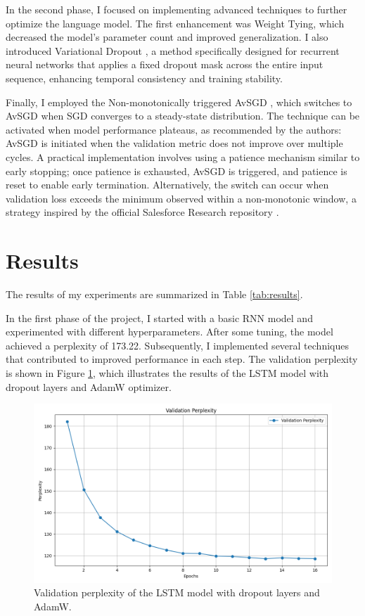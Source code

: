 \documentclass[a4paper]{article}
\begin{document}
In the second phase, I focused on implementing advanced techniques
 to further optimize the language model. The first enhancement was Weight Tying,
  which decreased the model’s parameter count and improved generalization. I also 
  introduced Variational Dropout \cite{gal2016theoreticallygroundedapplicationdropout}, 
  a method specifically designed for recurrent neural networks that applies a fixed dropout 
  mask across the entire input sequence, enhancing temporal consistency and training stability.

Finally, I employed the Non-monotonically triggered AvSGD \cite{merityRegOpt}, which 
switches to AvSGD when SGD converges to a steady-state distribution. The technique can be
 activated when model performance plateaus, as recommended by the authors: AvSGD is initiated 
 when the validation metric does not improve over multiple cycles. A practical implementation 
 involves using a patience mechanism similar to early stopping; once patience is exhausted, AvSGD
  is triggered, and patience is reset to enable early termination. Alternatively, the switch 
  can occur when validation loss exceeds the minimum observed within a non-monotonic window, a 
  strategy inspired by the official Salesforce Research repository \cite{salesforce-repo}.

\section{Results}
The results of my experiments are summarized in Table \ref{tab:results}.

In the first phase of the project, I started with a basic RNN model and experimented with different hyperparameters. After some tuning, the model achieved a perplexity of 173.22. Subsequently, I implemented several techniques that contributed to improved performance in each step. The validation perplexity is shown in Figure \ref{fig:plot}, which illustrates the results of the LSTM model with dropout layers and AdamW optimizer.

\begin{figure}[h!]
\centering
\includegraphics[width=0.8\linewidth]{images/part_A.png}
\caption{Validation perplexity of the LSTM model with dropout layers and AdamW.}
\label{fig:plot}
\end{figure}
\end{document}

